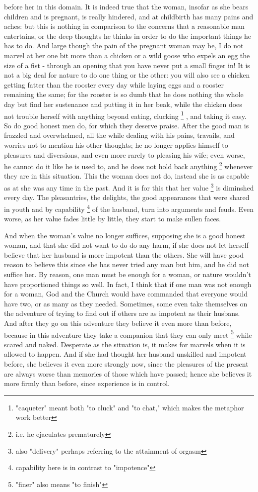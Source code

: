 \documentclass{book}
\begin{document}
before her in this domain. It is indeed true that the woman, insofar as she bears children and is pregnant, is really hindered, and at childbirth has many pains and aches: but this is nothing in comparison to the concerns that a reasonable man entertains, or the deep thoughts he thinks in order to do the important things he has to do. And large though the pain of the pregnant woman may be, I do not marvel at her one bit more than a chicken or a wild goose who expels an egg the size of a fist - through an opening that you have never put a small finger in! It is not a big deal for nature to do one thing or the other: you will also see a chicken getting fatter than the rooster every day while laying eggs and a rooster remaining the same; for the rooster is so dumb that he does nothing the whole day but find her sustenance and putting it in her beak, while the chicken does not trouble herself with anything beyond eating, clucking 
\footnote{"caqueter" meant both "to cluck" and "to chat," which makes the metaphor work better}
, and taking it easy. So do good honest men do, for which they deserve praise. After the good man is frazzled and overwhelmed, all the while dealing with his pains, travails, and worries not to mention his other thoughts; he no longer applies himself to pleasures and diversions, and even more rarely to pleasing his wife; even worse, he cannot do it like he is used to, and he does not hold back anything
\footnote{i.e. he ejaculates prematurely}
whenever they are in this situation. This the woman does not do, instead she is as capable as at she was any time in the past. And it is for this that her value
\footnote{also "delivery" perhaps referring to the attainment of orgasm}
is diminshed every day. The pleasantries, the delights, the good appearances that were shared in youth and by capability
\footnote{capability here is in contrast to "impotence"}
of the husband, turn into arguments and feuds. Even worse, as her value fades little by little, they start to make sullen faces.

And when the woman's value no longer suffices, supposing she is a good honest woman, and that she did not want to do do any harm, if she does not let herself believe that her husband is more impotent than the others. She will have good reason to believe this since she has never tried any man but him, and he did not suffice her. By reason, one man must be enough for a woman, or nature wouldn't have proportioned things so well. In fact, I think that if one man was not enough for a woman, God and the Church would have commanded that everyone would have two, or as many as they needed. Sometimes, some even take themselves on the adventure of trying to find out if others are as impotent as their husbans. And after they go on this adventure they believe it even more than before, because in this adventure they take a companion that they can only meet
\footnote{"finer" also means "to finish"}
while scared and naked. Desperate as the situation is, it makes for marvels when it is allowed to happen. And if she had thought her husband unskilled and impotent before, she believes it even more strongly now, since the pleasures of the present are always worse than memories of those which have passed; hence she believes it more firmly than before, since experience is in control. 
\end{document}
